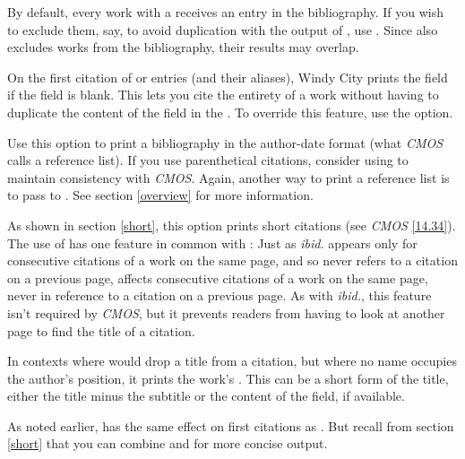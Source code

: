 \documentclass[11pt,letterpaper,oneside]{article}
\begin{document}
\begin{optionlist}

\noindent By default, every work with a  receives
an entry in the bibliography. If you wish to exclude them, say, to
avoid duplication with the output of , use
. Since  also excludes works from the
bibliography, their results may overlap.


\noindent On the first citation of  or
 entries (and their aliases), Windy City prints the
 field if the  field is blank. This
lets you cite the entirety of a work without having to duplicate the
content of the  field in the . To
override this feature, use the  option.


\noindent Use this option to print a bibliography in the author-date
format (what \textit{CMOS} calls a reference list). If you use
parenthetical citations, consider using  to maintain
consistency with \textit{CMOS}. Again, another way to print a
reference list is to pass  to
. See section \ref{overview} for more
information.


\noindent As shown in section \ref{short}, this option prints short
citations (see \textit{CMOS} \ref{14.34}). The use of  has
one feature in common with : Just as \textit{ibid.} appears
only for consecutive citations of a work on the same page, and so
never refers to a citation on a previous page,  affects
consecutive citations of a work on the same page, never in reference
to a citation on a previous page. As with \textit{ibid.}, this feature
isn't required by \textit{CMOS}, but it prevents readers from having
to look at another page to find the title of a citation.

In contexts where  would drop a title from a citation, but
where no name occupies the author's position, it prints the work's
. This can be a short form of the title, either
the title minus the subtitle or the content of the
 field, if available.

As noted earlier,  has the same effect on first citations
as . But recall from section \ref{short} that you can
combine  and  for more concise output.


\end{optionlist}
\end{document}
